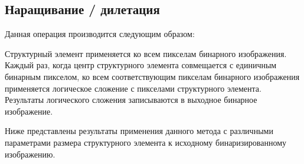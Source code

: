 \begin{figure}[H]
	\begin{minipage}[h]{0.49\linewidth}
	\end{minipage}
	\hfill
	\begin{minipage}[h]{0.49\linewidth}
	\end{minipage}
\end{figure}

\newpage

\subsection{Наращивание / дилетация}

Данная операция производится следующим образом: 

Структурный элемент применяется ко всем пикселам бинарного изображения. Каждый раз, когда центр структурного элемента совмещается с единичным бинарным пикселом, ко всем соответствующим пикселам бинарного изображения применяется логическое сложение с пикселами структурного элемента.  Результаты логического сложения записываются в выходное бинарное изображение.

Ниже представлены результаты применения данного метода с различными параметрами размера структурного элемента к исходному бинаризированному изображению.

